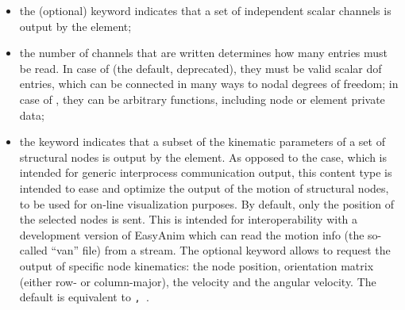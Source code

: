\begin{itemize}
\item the (optional) keyword  indicates that a set
of independent scalar channels is output by the element;

\item the number of channels  that are written
determines how many  entries must be read.
In case of  (the default, deprecated),
they must be valid scalar dof entries, which can be connected
in many ways to nodal degrees of freedom;
in case of , they can be arbitrary functions,
including node or element private data;

\item the keyword  indicates that a subset of the kinematic
parameters of a set of structural nodes is output by the element.
As opposed to the  case, which is intended for generic
interprocess communication output, this content type is intended to ease
and optimize the output of the motion of structural nodes,
to be used for on-line visualization purposes.
By default, only the position of the selected nodes is sent.
This is intended for interoperability with a development version
of EasyAnim which can read the motion info (the so-called ``van'' file)
from a stream.
The optional keyword  allows to request the output
of specific node kinematics: the node position, orientation matrix
(either row- or column-major), the velocity and the angular velocity.
The default is equivalent to \texttt{, }.
\end{itemize}



